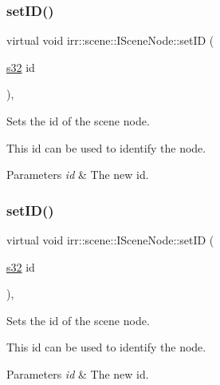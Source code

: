 \subsubsection{\texorpdfstring{set\+I\+D()}{setID()}\hspace{0.1cm}{\footnotesize\ttfamily [1/2]}}
{\footnotesize\ttfamily virtual void irr\+::scene\+::\+I\+Scene\+Node\+::set\+ID (\begin{DoxyParamCaption}\item[{\hyperlink{namespaceirr_ac66849b7a6ed16e30ebede579f9b47c6}{s32}}]{id }\end{DoxyParamCaption})\hspace{0.3cm}{\ttfamily [inline]}, {\ttfamily [virtual]}}



Sets the id of the scene node. 

This id can be used to identify the node. 
\begin{DoxyParams}{Parameters}
{\em id} & The new id. \\
\hline
\end{DoxyParams}
\mbox{\label{classirr_1_1scene_1_1ISceneNode_ade60c630c4768200b1d15debbd00fe0e}} 
\subsubsection{\texorpdfstring{set\+I\+D()}{setID()}\hspace{0.1cm}{\footnotesize\ttfamily [2/2]}}
{\footnotesize\ttfamily virtual void irr\+::scene\+::\+I\+Scene\+Node\+::set\+ID (\begin{DoxyParamCaption}\item[{\hyperlink{namespaceirr_ac66849b7a6ed16e30ebede579f9b47c6}{s32}}]{id }\end{DoxyParamCaption})\hspace{0.3cm}{\ttfamily [inline]}, {\ttfamily [virtual]}}



Sets the id of the scene node. 

This id can be used to identify the node. 
\begin{DoxyParams}{Parameters}
{\em id} & The new id. \\
\hline
\end{DoxyParams}
\mbox{\label{classirr_1_1scene_1_1ISceneNode_a7ceda3eb747a353ffeda02c26e697cbd}} 
